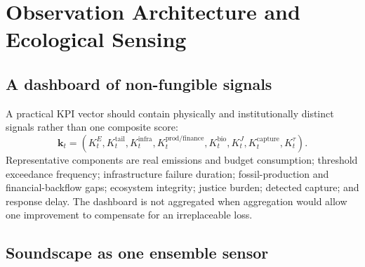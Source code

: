 \documentclass[11pt,a4paper]{article}
\numberwithin{equation}{section}
\theoremstyle{definition}
\theoremstyle{plain}
\theoremstyle{remark}
\newcommand{\kpi}{\bm{k}}
\begin{document}
\section{Observation Architecture and Ecological Sensing}

\subsection{A dashboard of non-fungible signals}

A practical KPI vector should contain physically and institutionally distinct signals rather than one composite score:
\begin{equation}
\kpi_t=
\left(
K_t^{E},K_t^{\mathrm{tail}},K_t^{\mathrm{infra}},K_t^{\mathrm{prod/finance}},
K_t^{\mathrm{bio}},K_t^{J},K_t^{\mathrm{capture}},K_t^{\tau}
\right).
\label{eq:dashboard}
\end{equation}
Representative components are real emissions and budget consumption; threshold exceedance frequency; infrastructure failure duration; fossil-production and financial-backflow gaps; ecosystem integrity; justice burden; detected capture; and response delay. The dashboard is not aggregated when aggregation would allow one improvement to compensate for an irreplaceable loss.

\subsection{Soundscape as one ensemble sensor}
\end{document}
